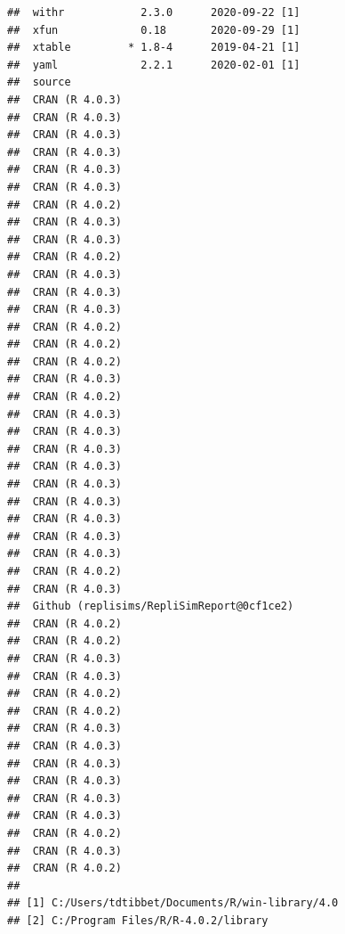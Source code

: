 \documentclass[10,a4paperpaper,]{article}
\begin{document}
\begin{verbatim}
##  withr            2.3.0      2020-09-22 [1]
##  xfun             0.18       2020-09-29 [1]
##  xtable         * 1.8-4      2019-04-21 [1]
##  yaml             2.2.1      2020-02-01 [1]
##  source                                   
##  CRAN (R 4.0.3)                           
##  CRAN (R 4.0.3)                           
##  CRAN (R 4.0.3)                           
##  CRAN (R 4.0.3)                           
##  CRAN (R 4.0.3)                           
##  CRAN (R 4.0.3)                           
##  CRAN (R 4.0.2)                           
##  CRAN (R 4.0.3)                           
##  CRAN (R 4.0.3)                           
##  CRAN (R 4.0.2)                           
##  CRAN (R 4.0.3)                           
##  CRAN (R 4.0.3)                           
##  CRAN (R 4.0.3)                           
##  CRAN (R 4.0.2)                           
##  CRAN (R 4.0.2)                           
##  CRAN (R 4.0.2)                           
##  CRAN (R 4.0.3)                           
##  CRAN (R 4.0.2)                           
##  CRAN (R 4.0.3)                           
##  CRAN (R 4.0.3)                           
##  CRAN (R 4.0.3)                           
##  CRAN (R 4.0.3)                           
##  CRAN (R 4.0.3)                           
##  CRAN (R 4.0.3)                           
##  CRAN (R 4.0.3)                           
##  CRAN (R 4.0.3)                           
##  CRAN (R 4.0.3)                           
##  CRAN (R 4.0.2)                           
##  CRAN (R 4.0.3)                           
##  Github (replisims/RepliSimReport@0cf1ce2)
##  CRAN (R 4.0.2)                           
##  CRAN (R 4.0.2)                           
##  CRAN (R 4.0.3)                           
##  CRAN (R 4.0.3)                           
##  CRAN (R 4.0.2)                           
##  CRAN (R 4.0.2)                           
##  CRAN (R 4.0.3)                           
##  CRAN (R 4.0.3)                           
##  CRAN (R 4.0.3)                           
##  CRAN (R 4.0.3)                           
##  CRAN (R 4.0.3)                           
##  CRAN (R 4.0.3)                           
##  CRAN (R 4.0.2)                           
##  CRAN (R 4.0.3)                           
##  CRAN (R 4.0.2)                           
## 
## [1] C:/Users/tdtibbet/Documents/R/win-library/4.0
## [2] C:/Program Files/R/R-4.0.2/library
\end{verbatim}
\end{document}
